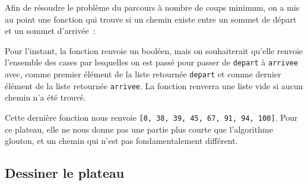 

Afin de résoudre le problème du parcours à nombre de coups minimum, on a mis au point une fonction qui trouve si un chemin existe entre un sommet de départ et un sommet d'arrivée~: 

\noindent 



Pour l'instant, la fonction renvoie un booléen, mais on souhaiterait qu'elle renvoie l'ensemble des cases par lesquelles on est passé pour passer de \texttt{depart} à \texttt{arrivee} avec, comme premier élément de la liste retournée \texttt{depart} et comme dernier élément de la liste retournée \texttt{arrivee}. La fonction renverra une liste vide si aucun chemin n'a été trouvé. 


%	


%	

Cette dernière fonction nous renvoie \texttt{[0, 38, 39, 45, 67, 91, 94, 100]}. Pour ce plateau, elle ne nous donne pas une partie plus courte que l'algorithme glouton, et un chemin qui n'est pas fondamentalement différent.

\subsection*{Dessiner le plateau}

